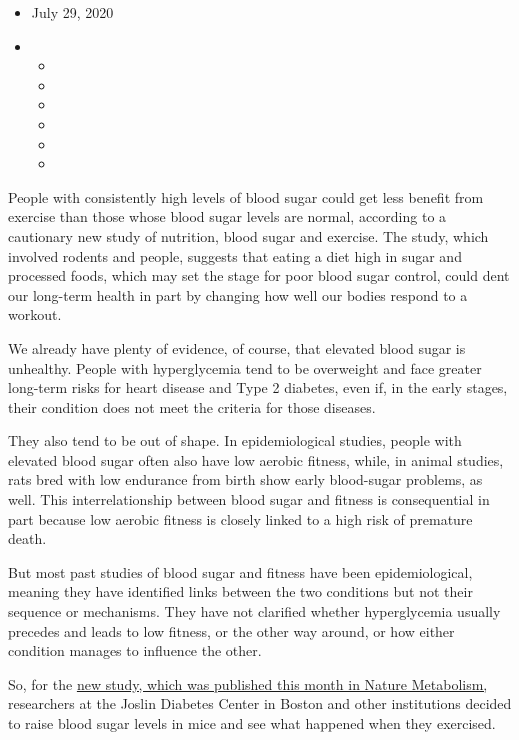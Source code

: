 \begin{itemize}
\item
  July 29, 2020
\item
  \begin{itemize}
  \item
  \item
  \item
  \item
  \item
  \item
  \end{itemize}
\end{itemize}

People with consistently high levels of blood sugar could get less
benefit from exercise than those whose blood sugar levels are normal,
according to a cautionary new study of nutrition, blood sugar and
exercise. The study, which involved rodents and people, suggests that
eating a diet high in sugar and processed foods, which may set the stage
for poor blood sugar control, could dent our long-term health in part by
changing how well our bodies respond to a workout.

We already have plenty of evidence, of course, that elevated blood sugar
is unhealthy. People with hyperglycemia tend to be overweight and face
greater long-term risks for heart disease and Type 2 diabetes, even if,
in the early stages, their condition does not meet the criteria for
those diseases.

They also tend to be out of shape. In epidemiological studies, people
with elevated blood sugar often also have low aerobic fitness, while, in
animal studies, rats bred with low endurance from birth show early
blood-sugar problems, as well. This interrelationship between blood
sugar and fitness is consequential in part because low aerobic fitness
is closely linked to a high risk of premature death.

But most past studies of blood sugar and fitness have been
epidemiological, meaning they have identified links between the two
conditions but not their sequence or mechanisms. They have not clarified
whether hyperglycemia usually precedes and leads to low fitness, or the
other way around, or how either condition manages to influence the
other.

So, for the \href{https://www.nature.com/articles/s42255-020-0240-7}{new
study, which was published this month in Nature Metabolism,} researchers
at the Joslin Diabetes Center in Boston and other institutions decided
to raise blood sugar levels in mice and see what happened when they
exercised.

